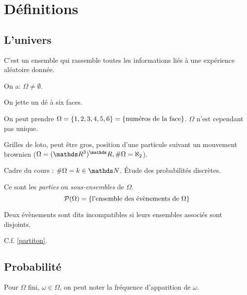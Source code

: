 \section{Définitions}

  \subsection{L'univers}

  \begin{definition}
    C'est un ensemble qui rassemble toutes les informations liés à une expérience
    aléatoire donnée.

    On a: $\Omega\neq\emptyset$.

  \end{definition}

    \begin{exemple}
      On jette un dé à six faces.

      On peut prendre $\Omega = \left\{1,2,3,4,5,6\right\} = \left\{\text{numéros de la face}\right\}$.
      $\Omega$ n'est cependant pas unique.
    \end{exemple}


    Grilles de loto, peut être gros, position d'une particule suivant un mouvement
    brownien ($\Omega = (\RR^3)^\RR, \#\Omega = \aleph_2$).

    Cadre du cours : $\#\Omega = k \in \NN$. \'Etude des probabilités discrètes.

  \begin{definition}
    Ce sont les \emph{parties} ou \emph{sous-ensembles} de $\Omega$.
    \[
      \mathcal{P}(\Omega) = \left\{\text{l'ensemble des évènements de $\Omega$}\right\}
    \]

    Deux évènements sont dits incompatibles si leurs ensembles associés sont
    disjoints.

  \end{definition}

  \begin{definition}
    C.f. \ref{partiton}.
  \end{definition}

  \subsection{Probabilité}
  Pour $\Omega$ fini, $\omega \in \Omega$, on peut noter la fréquence d'apparition
  de $\omega$.

